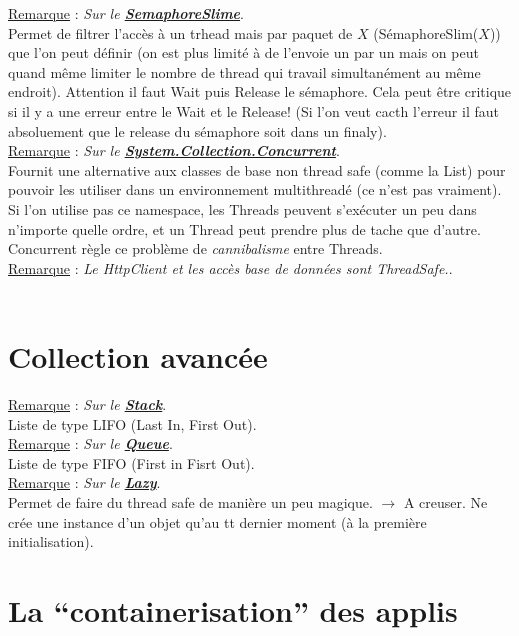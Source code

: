 \documentclass[a4paper,12pt,twoside]{article}
\newcommand{\urlcolor}{magenta}  %
\newcommand{\keycolor}{purple} %
\newcommand{\rem}[2]{\noindent\underline{Remarque} : \textit{#1}.\\ \indent #2}
\newcommand{\keyref}[2]{\hypersetup{urlcolor=\keycolor} \href{#1}{\textbf{#2}}\hypersetup{urlcolor=\urlcolor}}
\begin{document}
\rem{Sur le \keyref{https://docs.microsoft.com/en-us/dotnet/api/system.threading.semaphoreslim?view=net-6.0}{SemaphoreSlime}}{Permet de filtrer l'accès à un trhead mais par paquet de $X$ (SémaphoreSlim($X$)) que l'on peut définir (on est plus limité à de l'envoie un par un  mais on peut quand même limiter le nombre de thread qui travail simultanément au même endroit). Attention il faut Wait puis Release le sémaphore. Cela peut être critique si il y a une erreur entre le Wait et le Release! (Si l'on veut cacth l'erreur il faut absoluement que le release du sémaphore soit dans un finaly).}\\

\rem{Sur le \keyref{https://docs.microsoft.com/en-us/dotnet/api/system.collections.concurrent?view=net-6.0}{System.Collection.Concurrent}}{Fournit une alternative aux classes de base non thread safe (comme la List) pour pouvoir les utiliser dans un environnement multithreadé (ce n'est pas vraiment). Si l'on utilise pas ce namespace, les Threads peuvent s'exécuter un peu dans n'importe quelle ordre, et un Thread peut prendre plus de tache que d'autre. Concurrent règle ce problème de \textit{cannibalisme} entre Threads.}\\

\rem{Le HttpClient et les accès base de données sont ThreadSafe.}\\

\section{Collection avancée}

\rem{Sur le \keyref{https://docs.microsoft.com/fr-fr/dotnet/api/system.collections.stack?view=net-6.0}{Stack}}{Liste de type LIFO (Last In, First Out).}\\

\rem{Sur le \keyref{https://docs.microsoft.com/fr-fr/dotnet/api/system.collections.queue?view=net-6.0}{Queue}}{Liste de type FIFO (First in Fisrt Out).}\\

\rem{Sur le \keyref{https://docs.microsoft.com/fr-fr/dotnet/api/system.lazy-1?view=net-6.0}{Lazy}}{Permet de faire du thread safe de manière un peu magique. $\to$ A creuser. Ne crée une instance d'un objet qu'au tt dernier moment (à la première initialisation).}\\

\section{La ``containerisation'' des applis}
\end{document}
